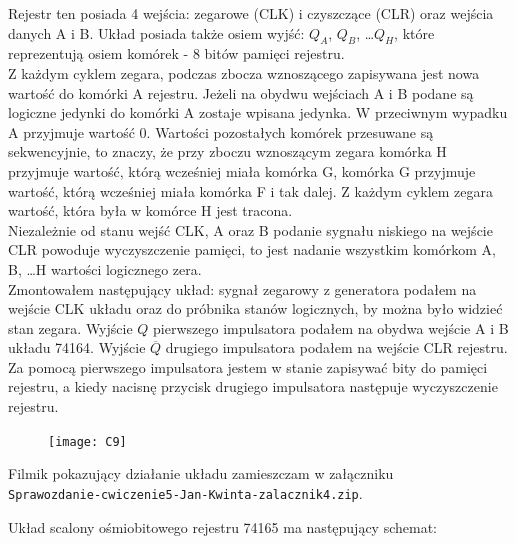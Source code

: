 \documentclass[14pt, table]{extarticle}
\begin{document}
Rejestr ten posiada 4 wejścia: zegarowe (CLK) i czyszczące (CLR) oraz wejścia danych A i B. Układ posiada także osiem wyjść: $Q_A$, $Q_B$, \ldots $Q_H$, które reprezentują osiem komórek - 8 bitów pamięci rejestru. \\

Z każdym cyklem zegara, podczas zbocza wznoszącego zapisywana jest nowa wartość do komórki A rejestru. Jeżeli na obydwu wejściach A i B podane są logiczne jedynki do komórki A zostaje wpisana jedynka. W przeciwnym wypadku A przyjmuje wartość 0. Wartości pozostałych komórek przesuwane są sekwencyjnie, to znaczy, że przy zboczu wznoszącym zegara komórka H przyjmuje wartość, którą wcześniej miała komórka G, komórka G przyjmuje wartość, którą wcześniej miała komórka F i tak dalej. Z każdym cyklem zegara wartość, która była w komórce H jest tracona. \\

Niezależnie od stanu wejść CLK, A oraz B podanie sygnału niskiego na wejście CLR powoduje wyczyszczenie pamięci, to jest nadanie wszystkim komórkom A, B, \ldots H wartości logicznego zera. \\

Zmontowałem następujący układ: sygnał zegarowy z generatora podałem na wejście CLK układu oraz do próbnika stanów logicznych, by można było widzieć stan zegara. Wyjście $Q$ pierwszego impulsatora podałem na obydwa wejście A i B układu 74164. Wyjście $\overline{Q}$ drugiego impulsatora podałem na wejście CLR rejestru. \\

Za pomocą pierwszego impulsatora jestem w stanie zapisywać bity do pamięci rejestru, a kiedy nacisnę przycisk drugiego impulsatora następuje wyczyszczenie rejestru.

\begin{figure}[H]
\texttt{[image: C9]}
\centering
\captionsetup{labelformat=empty}
\caption{}
\end{figure}

Filmik pokazujący działanie układu zamieszczam w załączniku \\ \texttt{Sprawozdanie-cwiczenie5-Jan-Kwinta-zalacznik4.zip}.

\newpage

Układ scalony ośmiobitowego rejestru 74165 ma następujący schemat:
\end{document}
